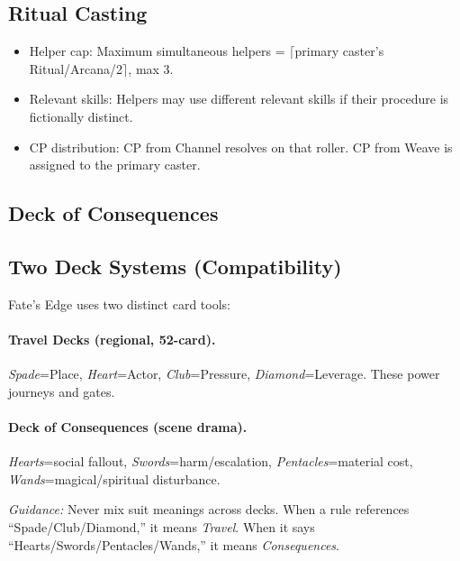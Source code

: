 \documentclass[11pt]{article}
\begin{document}
\subsection{Ritual Casting}
\begin{itemize}
    \item Helper cap: Maximum simultaneous helpers = $\lceil$primary caster's Ritual/Arcana/2$\rceil$, max 3.
    \item Relevant skills: Helpers may use different relevant skills if their procedure is fictionally distinct.
    \item CP distribution: CP from Channel resolves on that roller. CP from Weave is assigned to the primary caster.
\end{itemize}

\subsection{Deck of Consequences}

\subsection{Two Deck Systems (Compatibility)}
Fate's Edge uses two distinct card tools:

\paragraph{Travel Decks (regional, 52-card).}
\emph{Spade}=Place, \emph{Heart}=Actor, \emph{Club}=Pressure, \emph{Diamond}=Leverage. These power journeys and gates.

\paragraph{Deck of Consequences (scene drama).}
\emph{Hearts}=social fallout, \emph{Swords}=harm/escalation, \emph{Pentacles}=material cost, \emph{Wands}=magical/spiritual disturbance.

\textit{Guidance:} Never mix suit meanings across decks. When a rule references ``Spade/Club/Diamond,'' it means \emph{Travel}. When it says ``Hearts/Swords/Pentacles/Wands,'' it means \emph{Consequences}.
\end{document}
